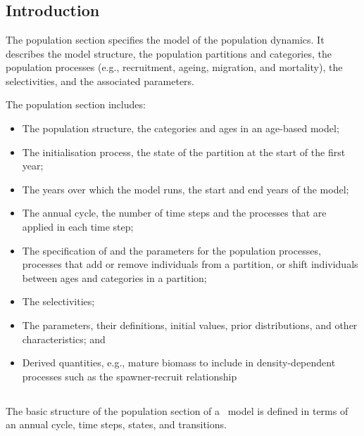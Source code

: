 \section{\label{sec:population-section}}

\subsection{Introduction}

The population section specifies the model of the population dynamics. It describes the model structure, the population partitions and categories, the population processes (e.g., recruitment, ageing, migration, and mortality), the selectivities, and the associated parameters.

The population section includes:

\begin{itemize}
  \item The population structure, the categories and ages in an age-based model;
  \item The initialisation process, the state of the partition at the start of the first year;
  \item The years over which the model runs, the start and end years of the model;
  \item The annual cycle, the number of time steps and the processes that are applied in each time step;
  \item The specification of and the parameters for the population processes, processes that add or remove individuals from a partition, or shift individuals between ages and categories in a partition;
  \item The selectivities;
  \item The parameters, their definitions, initial values, prior distributions, and other characteristics; and
  \item Derived quantities, e.g., mature biomass to include in density-dependent processes such as the spawner-recruit relationship
\end{itemize}

\subsection{}\label{sub:sec:pop_sec}

The basic structure of the population section of a \CNAME\ model is defined in terms of an annual cycle, time steps, states, and transitions.

